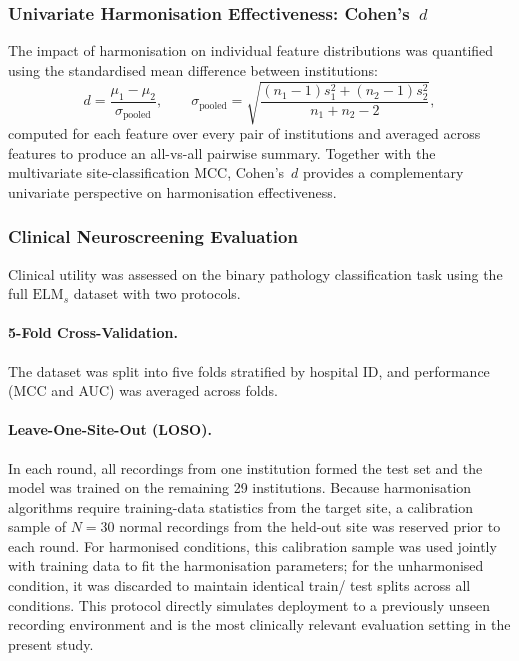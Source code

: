 \documentclass[preprint,12pt]{elsarticle}
\begin{document}
\subsubsection{Univariate Harmonisation Effectiveness: Cohen's~$d$}
\label{subsubsec:cohend}

The impact of harmonisation on individual feature distributions was
quantified using the standardised mean difference between institutions:
\begin{equation}
  d = \frac{\mu_1 - \mu_2}{\sigma_{\mathrm{pooled}}},
  \qquad
  \sigma_{\mathrm{pooled}} =
    \sqrt{\frac{(n_1-1)s_1^2 + (n_2-1)s_2^2}{n_1+n_2-2}},
  \label{eq:cohend}
\end{equation}
computed for each feature over every pair of institutions and
averaged across features to produce an all-vs-all pairwise summary.
Together with the multivariate site-classification MCC, Cohen's~$d$
provides a complementary univariate perspective on harmonisation
effectiveness.

\subsubsection{Clinical Neuroscreening Evaluation}
\label{subsubsec:clinical_eval}

Clinical utility was assessed on the binary pathology classification
task using the full $\mathrm{ELM}_s$ dataset with two protocols.

\paragraph{5-Fold Cross-Validation.}
The dataset was split into five folds stratified by hospital ID,
and performance (MCC and AUC) was averaged across folds.

\paragraph{Leave-One-Site-Out (LOSO).}
In each round, all recordings from one institution formed the test
set and the model was trained on the remaining 29 institutions.
Because harmonisation algorithms require training-data statistics
from the target site, a calibration sample of $N = 30$ normal
recordings from the held-out site was reserved prior to each round.
For harmonised conditions, this calibration sample was used jointly
with training data to fit the harmonisation parameters; for the
unharmonised condition, it was discarded to maintain identical train/
test splits across all conditions.
This protocol directly simulates deployment to a previously unseen
recording environment and is the most clinically relevant evaluation
setting in the present study.
\end{document}
